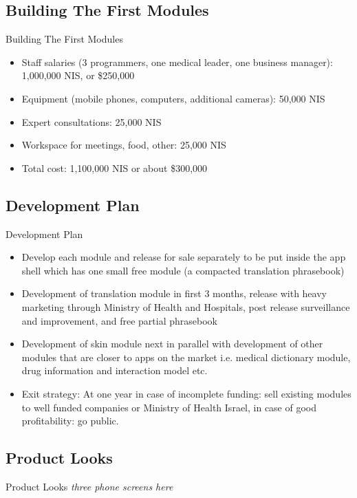 \documentclass[presentation]{beamer}
\begin{document}
\subsection{Building The First Modules}
\label{sec-1-4}
\begin{frame}[label=sec-1-4-1]{Building The First Modules}
\begin{itemize}
\item Staff salaries (3 programmers, one medical leader, one business
manager): 1,000,000 NIS, or \$250,000
\item Equipment (mobile phones, computers, additional cameras): 50,000 NIS
\item Expert consultations: 25,000 NIS
\item Workspace for meetings, food, other: 25,000 NIS
\item Total cost: 1,100,000 NIS or about \$300,000
\end{itemize}
\end{frame}

\subsection{Development Plan}
\label{sec-1-5}
\begin{frame}[label=sec-1-5-1]{Development Plan}
\begin{itemize}
\item Develop each module and release for sale separately to be put inside
the app shell which has one small free module (a compacted
translation phrasebook)
\item Development of translation module in first 3 months, release with
heavy marketing through Ministry of Health and Hospitals, post
release surveillance and improvement, and free partial phrasebook
\item Development of skin module next in parallel with development of
other modules that are closer to apps on the market i.e. medical
dictionary module, drug information and interaction model etc.
\item Exit strategy: At one year in case of incomplete funding: sell
existing modules to well funded companies or Ministry of Health
Israel, in case of good profitability: go public.
\end{itemize}
\end{frame}

\subsection{Product Looks}
\label{sec-1-6}
\begin{frame}[label=sec-1-6-1]{Product Looks}
\emph{three phone screens here}
\end{frame}
\end{document}
